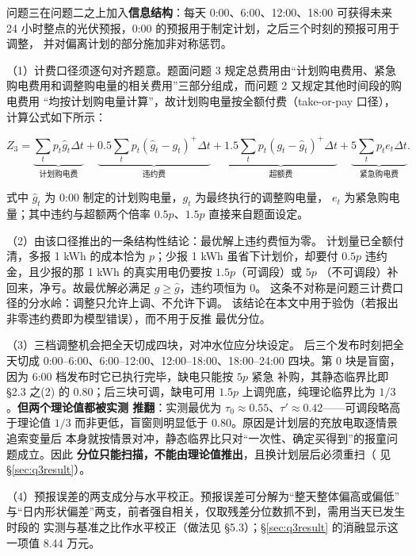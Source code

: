 \documentclass[withoutpreface]{cumcmthesis}
\renewcommand{\emph}[1]{\textbf{#1}}
\begin{document}
问题三在问题二之上加入\emph{信息结构}：每天 0:00、6:00、12:00、18:00 可获得未来
24 小时整点的光伏预报，0:00 的预报用于制定计划，之后三个时刻的预报可用于调整，
并对偏离计划的部分施加非对称惩罚。

\noindent（1）计费口径须逐句对齐题意。题面问题 3 规定总费用由“计划购电费用、紧急
购电费用和调整购电量的相关费用”三部分组成，而问题 2 又规定其他时间段的购电费用
“均按计划购电量计算”，故计划购电量按全额付费（take-or-pay 口径），计算公式如下所示：

\begin{equation}
Z_3=\underbrace{\sum_t p_t\hat g_t\Delta t}_{\text{计划购电费}}
   +\underbrace{0.5\sum_t p_t(\hat g_t-g_t)^{+}\Delta t}_{\text{违约费}}
   +\underbrace{1.5\sum_t p_t(g_t-\hat g_t)^{+}\Delta t}_{\text{超额费}}
   +\underbrace{5\sum_t p_t e_t\Delta t}_{\text{紧急购电费}} .
\label{eq:q3cost}
\end{equation}

式中 $\hat g_t$ 为 0:00 制定的计划购电量，$g_t$ 为最终执行的调整购电量，
$e_t$ 为紧急购电量；其中违约与超额两个倍率 $0.5p$、$1.5p$ 直接来自题面设定。

\noindent（2）由该口径推出的一条结构性结论：最优解上违约费恒为零。
计划量已全额付清，多报 1 kWh 的成本恰为 $p$；少报 1 kWh 虽省下计划价，却要付
$0.5p$ 违约金，且少报的那 1 kWh 的真实用电仍要按 $1.5p$（可调段）或 $5p$
（不可调段）补回来，净亏。故最优解必满足 $g\ge\hat g$，违约项恒为 0。
这条不对称是问题三计费口径的分水岭：调整只允许上调、不允许下调。
该结论在本文中用于验伪（若报出非零违约费即为模型错误），而不用于反推
最优分位。

\noindent（3）三档调整机会把全天切成四块，对冲水位应分块设定。
后三个发布时刻把全天切成 0:00--6:00、6:00--12:00、12:00--18:00、18:00--24:00
四块。第 0 块是盲窗，因为 6:00 档发布时它已执行完毕，缺电只能按 $5p$ 紧急
补购，其静态临界比即 \S2.3 之(2) 的 $0.80$；后三块可调，缺电可用 $1.5p$
上调兜底，纯理论临界比为 $1/3$。\textbf{但两个理论值都被实测
推翻}：实测最优为 $\tau_0\approx0.55$、$\tau'\approx0.42$——可调段略高于理论值
$1/3$ 而非更低，盲窗则明显低于 $0.80$。原因是计划层的充放电取逐情景追索变量后
本身就按情景对冲，静态临界比只对“一次性、确定买得到”的报童问题成立。因此
\textbf{分位只能扫描，不能由理论值推出}，且换计划层后必须重扫（
见 §\ref{sec:q3result}）。

\noindent（4）预报误差的两支成分与水平校正。预报误差可分解为“整天整体偏高或偏低”
与“日内形状偏差”两支，前者强自相关，仅取残差分位数抓不到，需用当天已发生时段的
实测与基准之比作水平校正（做法见 §5.3）；\S\ref{sec:q3result} 的消融显示这一项值
8.44 万元。
\end{document}
